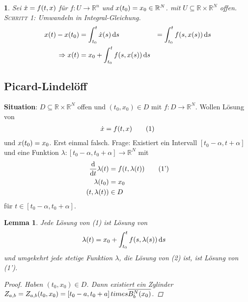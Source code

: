 \documentclass[11pt, a4paper]{article}
\theoremstyle{plain}
\newtheorem{lemma}[blockelement]{Lemma}
\newtheorem{genv}[blockelement]{}
\numberwithin{equation}{subsection}
\newcommand{\pair}[1]{\left(#1\right)}
\newcommand{\of}[1]{\mathopen{}\mathclose{}\bgroup\left(#1\aftergroup\egroup\right)}
\newcommand{\interv}[1]{\left[#1\right]}
\newcommand{\impl}[0]{\Rightarrow{}}
\newcommand{\dif}{\mathop{}\!\mathrm{d}}
\newcommand{\R}{\mathbb{R}}
\begin{document}
    \begin{genv}
        Sei $\dot x = f\of{t, x}$ für $f: U \to \R^n$ und $x\of{t_0} = x_0\in\R^N$. mit $U\subseteq \R\times\R^N$ offen.\\
        \textsc{Schritt 1}: Umwandeln in Integral-Gleichung.\\
        \begin{align*}
            x\of{t} - x\of{t_0} &= \int_{t_0}^{t} \dot x \of{s} \dif s &= \int_{t_0}^{t} f\of{s, x\of{s}} \dif s\\
            \impl x\of{t} &= x_0 + \int_{t_0}^{t} f\of{s, x\of{s}} \dif s
        \end{align*}
    \end{genv}

    \subsection{Picard-Lindelöff}

    \marginnote{[15. Jul]}

    \textbf{Situation}: $D\subseteq \R\times\R^N$ offen und $\pair{t_0, x_0}\in D$ mit $f: D\to\R^N$. Wollen Lösung von
    \begin{align*}
        \dot x = f\of{t, x}\tag{1}
    \end{align*}
    und $x\of{t_0} = x_0$. Erst einmal falsch. Frage: Existiert ein Intervall $\interv{t_0 - \alpha, t + \alpha}$ und eine Funktion $\lambda: \interv{t_0 - \alpha, t_0 + \alpha} \to\R^N$ mit
    \begin{align*}
        \frac{\dif}{\dif t}\lambda\of{t} &= f\of{t, \lambda\of{t}}\tag{1'}\\
        \lambda\of{t_0} &= x_0\\
        \pair{t, \lambda\of{t}} &\in D
    \end{align*}
    für $t\in\interv{t_0 - \alpha, t_0 + \alpha}$.

    \begin{lemma} %
        Jede Lösung von (1) ist Lösung von
        \begin{align*}
            \lambda\of{t} &= x_0 + \int_{t_0}^{t} f\of{s, \lambda\of{s}} \dif s
        \end{align*}
        und umgekehrt jede stetige Funktion $\lambda$, die Lösung von (2) ist, ist Lösung von (1').

        \begin{proof}
            Haben $(t_0, x_0)\in D$. Dann existiert ein Zylinder $Z_{a,b} = Z_{a,b}\of{t_0, x_0} = \interv{t_0 - a, t_0 + a} times \overline{B_b^N\of{x_0}}$.
        \end{proof}
    \end{lemma}
\end{document}
